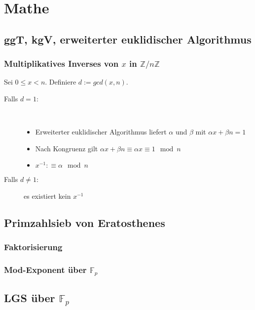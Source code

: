 \section{Mathe}

\subsection{ggT, kgV, erweiterter euklidischer Algorithmus}



\subsubsection{Multiplikatives Inverses von $x$ in $\mathbb{Z}/n\mathbb{Z}$}
Sei $0 \leq x < n$. Definiere $d := gcd(x, n)$.
\begin{description}
	\item[Falls $d = 1$:] ~
	\begin{itemize}[nosep]
		\item Erweiterter euklidischer Algorithmus liefert $\alpha$ und $\beta$ mit $\alpha x + \beta n = 1$
		\item Nach Kongruenz gilt $\alpha x + \beta n \equiv \alpha x \equiv 1 \mod n$
		\item $x^{-1} :\equiv \alpha \mod n$
	\end{itemize}
	\item[Falls $d \neq 1$:] es existiert kein $x^{-1}$
\end{description}


\subsection{Primzahlsieb von Eratosthenes}


\subsubsection{Faktorisierung}


\subsubsection{Mod-Exponent über $\mathbb{F}_p$}


\subsection{LGS über $\mathbb{F}_p$}


